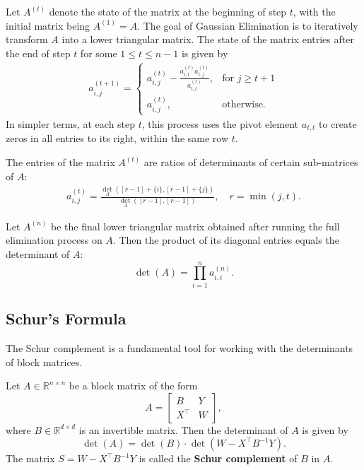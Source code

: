 \documentclass[11pt]{article}
\theoremstyle{definition}
\begin{document}
Let $A^{(t)}$ denote the state of the matrix at the beginning of step $t$, with the initial matrix being $A^{(1)} = A$. The goal of Gaussian Elimination is to iteratively transform $A$ into a lower triangular matrix. The state of the matrix entries after the end of step $t$ for some $1\leq t\leq n-1$ is given by 
\begin{align}
	a_{i,j}^{(t+1)}=\begin{cases} a_{i,j}^{(t)}-\frac{a_{i,t}^{(t)}a_{t,j}^{(t)}}{a_{t,t}^{(t)}}  , &\text{for $j\geq t+1$}\\
		a_{i,j}^{(t)}, &\text{otherwise.}
	\end{cases}
\end{align}
In simpler terms, at each step $t$, this process uses the pivot element $a_{t,t}$ to create zeros in all entries to its right, within the same row $t$.
\begin{theorem}
	\label{thm:Gaussian-determinant}
	The entries of the matrix $A^{(t)}$ are ratios of determinants of certain sub-matrices of $A$: 
	\begin{align*}
		a_{i,j}^{(t)} =\frac{\det_A\left([r-1]+\{i\}, [r-1]+\{j\}\right)}{\det_A([r-1],[r-1])}, \quad r=\min(j,t).
	\end{align*}
\end{theorem}

\begin{corollary}
	\label{cor:Gauss_elim-invar}
	Let $A^{(n)}$ be the final lower triangular matrix obtained after running the full elimination process on $A$. Then the product of its diagonal entries equals the determinant of $A$:
	\begin{equation*}
		\det(A) = \prod_{i=1}^{n} a_{i,i}^{(n)}.
	\end{equation*}
\end{corollary}


\subsection{Schur's Formula}

The Schur complement is a fundamental tool for working with the determinants of block matrices.

\begin{theorem} 
	\label{thm:schur_formula}
	Let $A \in \mathbb{R}^{n \times n}$ be a block matrix of the form
	\begin{equation*}
		A = \begin{bmatrix}
			B & Y \\
			X^{\top} & W
		\end{bmatrix},
	\end{equation*}
	where $B \in \mathbb{R}^{d \times d}$ is an invertible matrix. Then the determinant of $A$ is given by
	\begin{equation*}
		\det(A) = \det(B) \cdot \det(W - X^{\top} B^{-1} Y).
	\end{equation*}
	The matrix $S = W - X^{\top} B^{-1} Y$ is called the \textbf{Schur complement} of $B$ in $A$.
\end{theorem}
\end{document}
